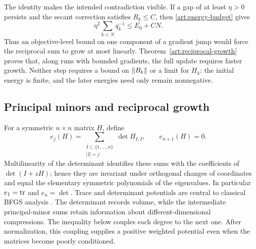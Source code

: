 The identity makes the intended contradiction visible. If a gap of at least
$\eta>0$ persists and the secant correction satisfies $R_k\le C$, then
\eqref{art:energy-budget} gives
\[
 \eta^2\sum_{k<N}q_k^{-1}\le E_0+CN.
\]
Thus an objective-level bound on one component of a gradient jump would
force the reciprocal sum to grow at most linearly. Theorem~\ref{art:reciprocal-growth}
proves that, along runs with bounded gradients, the full update requires
faster growth. Neither step requires a bound
on $\lVert B_k\rVert$ or a limit for $H_k$: the initial energy is finite, and the
later energies need only remain nonnegative.

\subsection{Principal minors and reciprocal growth}

For a symmetric $n\times n$ matrix $H$, define
\[
 e_j(H)=\sum_{\substack{I\subset\{1,\ldots,n\}\\|I|=j}}\det H_{I,I},
 \qquad e_{n+1}(H)=0.
\]
Multilinearity of the determinant identifies these sums with the coefficients of $\det(I+zH)$; hence they are invariant
under orthogonal changes of coordinates and equal the elementary symmetric
polynomials of the eigenvalues. In particular $e_1=\operatorname{tr}$ and $e_n=\det$.
Trace and determinant potentials are central to classical BFGS analysis
\cite{FND_N92,FND_BN89}. The determinant records volume, while the intermediate
principal-minor sums retain information about different-dimensional
compressions. The inequality below couples each degree to the next one.
After normalization, this coupling supplies a positive weighted potential
even when the matrices become poorly conditioned.

